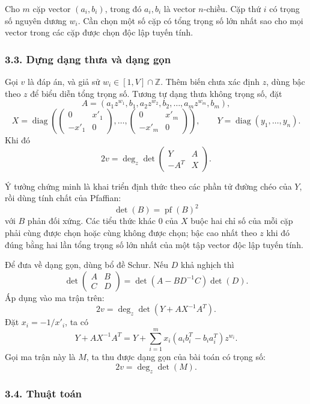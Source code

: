 \documentclass[11pt]{article}
\begin{document}
Cho \(m\) cặp vector \((a_i,b_i)\), trong đó \(a_i,b_i\) là vector \(n\)-chiều.
Cặp thứ \(i\) có trọng số nguyên dương \(w_i\). Cần chọn một số cặp có tổng
trọng số lớn nhất sao cho mọi vector trong các cặp được chọn độc lập tuyến tính.

\subsubsection*{3.3. Dựng dạng thưa và dạng gọn}

Gọi \(v\) là đáp án, và giả sử \(w_i\in[1,V]\cap\mathbb Z\). Thêm biến chưa xác
định \(z\), dùng bậc theo \(z\) để biểu diễn tổng trọng số. Tương tự dạng thưa
không trọng số, đặt
\[
  A=(a_1z^{w_1},b_1,a_2z^{w_2},b_2,\ldots,a_mz^{w_m},b_m),
\]
\[
  X=\operatorname{diag}\left(
  \begin{pmatrix}0&x'_1\\-x'_1&0\end{pmatrix},
  \ldots,
  \begin{pmatrix}0&x'_m\\-x'_m&0\end{pmatrix}\right),\qquad
  Y=\operatorname{diag}(y_1,\ldots,y_n).
\]
Khi đó
\[
  2v=\deg_z\det
  \begin{pmatrix}
    Y&A\\
    -A^T&X
  \end{pmatrix}.
\]

Ý tưởng chứng minh là khai triển định thức theo các phần tử đường chéo của
\(Y\), rồi dùng tính chất của Pfaffian:
\[
  \det(B)=\operatorname{pf}(B)^2
\]
với \(B\) phản đối xứng. Các tiểu thức khác \(0\) của \(X\) buộc hai chỉ số của
mỗi cặp phải cùng được chọn hoặc cùng không được chọn; bậc cao nhất theo \(z\)
khi đó đúng bằng hai lần tổng trọng số lớn nhất của một tập vector độc lập
tuyến tính.

Để đưa về dạng gọn, dùng bổ đề Schur. Nếu \(D\) khả nghịch thì
\[
  \det
  \begin{pmatrix}
    A&B\\
    C&D
  \end{pmatrix}
  =\det(A-BD^{-1}C)\det(D).
\]
Áp dụng vào ma trận trên:
\[
  2v=\deg_z\det(Y+AX^{-1}A^T).
\]
Đặt \(x_i=-1/x'_i\), ta có
\[
  Y+AX^{-1}A^T
  =
  Y+\sum_{i=1}^{m}x_i(a_ib_i^T-b_ia_i^T)z^{w_i}.
\]
Gọi ma trận này là \(M\), ta thu được dạng gọn của bài toán có trọng số:
\[
  2v=\deg_z\det(M).
\]

\subsubsection*{3.4. Thuật toán}
\end{document}
